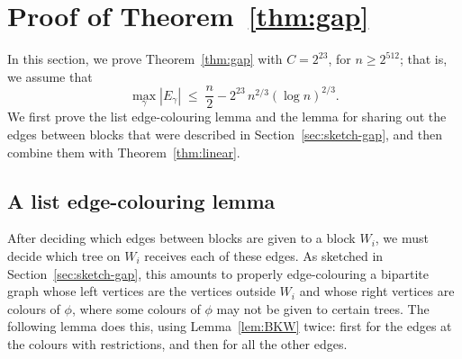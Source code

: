 \section{Proof of Theorem~\ref{thm:gap}}\label{sec:gap}
In this section, we prove Theorem~\ref{thm:gap} with $C=2^{23}$, for $n\ge2^{512}$; that is, we assume that
\begin{equation}\label{eq:gap}
\max_\gamma |E_\gamma|\;\le\;\frac n2-2^{23}\,n^{2/3}(\log n)^{2/3}.
\end{equation}
We first prove the list edge-colouring lemma and the lemma for sharing out the edges between blocks that were described in Section~\ref{sec:sketch-gap}, and then combine them with Theorem~\ref{thm:linear}.

\subsection{A list edge-colouring lemma}\label{sec:list}
After deciding which edges between blocks are given to a block $W_i$, we must decide which tree on $W_i$ receives each of these edges.
As sketched in Section~\ref{sec:sketch-gap}, this amounts to properly edge-colouring a bipartite graph whose left vertices are the vertices outside $W_i$ and whose right vertices are colours of $\phi$, where some colours of $\phi$ may not be given to certain trees.
The following lemma does this, using Lemma~\ref{lem:BKW} twice: first for the edges at the colours with restrictions, and then for all the other edges.

